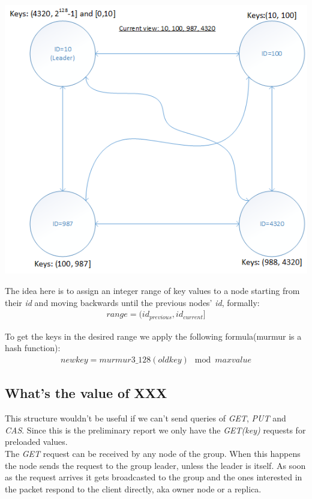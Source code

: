 \documentclass[a4paper, 11pt]{article}
\begin{document}
{\centering\includegraphics[scale = 0.7]{./figures/key-assignment.png}\par}

\noindent The idea here is to assign an integer range of key values to a node starting from their \textit{id} and moving  backwards until the previous nodes' \textit{id}, formally:
\begin{gather*}
range = (id_{previous}, id_{current}]
\end{gather*}

\noindent To get the keys in the desired range we apply the following formula(murmur is a hash function):
\begin{gather*}
newkey = murmur3\_128(oldkey) \mod{maxvalue}
\end{gather*}

\subsection{What's the value of XXX}

\noindent This structure wouldn't be useful if we can't send queries of \textit{GET}, \textit{PUT} and \textit{CAS}. Since this is the preliminary report we only have the \textit{GET(key)} requests for preloaded values. \\
\noindent The \textit{GET} request can be received by any node of the group. When this happens the node sends the request to the group leader, unless the leader is itself. As soon as the request arrives it gets broadcasted to the group and the ones interested in the packet respond to the client directly, aka owner node or a replica.
\end{document}
